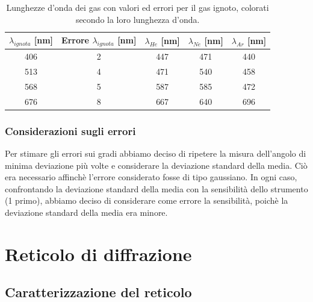 \documentclass[letterpaper,12pt]{article}
\begin{document}
\begin{table}[h!]
    \centering
    \begin{tabular}{|c|c|c|c|c|}
    \hline
    \textbf{$\lambda_{ignota}$} [nm] & \textbf{Errore $\lambda_{ignota}$} [nm] & \textbf{$\lambda_{He}$} [nm] & \textbf{$\lambda_{Ne}$} [nm] & \textbf{$\lambda_{Ar}$} [nm]\\
    \hline
    \cellcolor{wavelength_406} 406 & \cellcolor{wavelength_nan}2 & \cellcolor{wavelength_447} 447 & \cellcolor{wavelength_471} 471 & \cellcolor{wavelength_440} 440 \\
    \hline
    \cellcolor{wavelength_513} 513 & \cellcolor{wavelength_nan}4 & \cellcolor{wavelength_471} 471 & \cellcolor{wavelength_540} 540 & \cellcolor{wavelength_458} 458 \\
    \hline
    \cellcolor{wavelength_568} 568 & \cellcolor{wavelength_nan}5 & \cellcolor{wavelength_587} 587 & \cellcolor{wavelength_585} 585 & \cellcolor{wavelength_472} 472 \\
    \hline
    \cellcolor{wavelength_676} 676 & \cellcolor{wavelength_nan}8 & \cellcolor{wavelength_667} 667 & \cellcolor{wavelength_640} 640 & \cellcolor{wavelength_696} 696 \\
    \hline
    \end{tabular}
    \caption{Lunghezze d'onda dei gas con valori ed errori per il gas ignoto, colorati secondo la loro lunghezza d'onda.}
    \label{tab:prisma_ignoto}
\end{table}

\subsubsection{Considerazioni sugli errori}
Per stimare gli errori sui gradi abbiamo deciso di ripetere la misura dell'angolo di minima deviazione più volte e 
considerare la deviazione standard della media. Ciò era necessario affinchè l'errore considerato fosse di tipo gaussiano. 
In ogni caso, confrontando la deviazione standard della media con la sensibilità dello strumento (1 primo), 
abbiamo deciso di considerare come errore la sensibilità, poichè la deviazione standard della media era minore.



\section{Reticolo di diffrazione}

\subsection{Caratterizzazione del reticolo}
\end{document}
